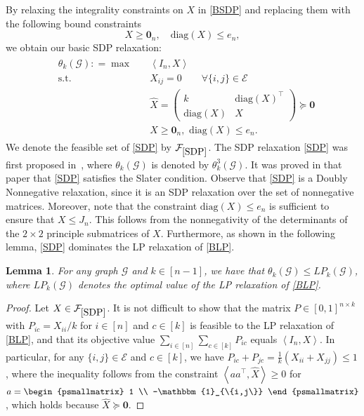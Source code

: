 \documentclass[11pt, a4paper]{article}
\newtheorem{lemma}[theorem]{Lemma}
\newcommand{\diag}[1]{{\text{diag}\left(#1\right)}}
\newcommand{\IP}[2]{\left\langle #1, #2 \right\rangle}
\newcommand{\eqdef}{\mathrel{\mathop:}=}
\newcommand{\psd}{\succeq}
\newcommand{\mc}{\mathcal}
\newcommand{\aug}[1]{\hat{#1}}
\begin{document}
By relaxing the integrality constraints on $X$ in \eqref{BSDP} and replacing them with the following bound constraints
\begin{equation}
    X \geq \textbf{0}_n, \quad \diag{X} \leq e_n, \label{eq bounds}
\end{equation}
we obtain our basic SDP relaxation:
\begin{align} \tag{SDP$_k$} \label{SDP} &\begin{aligned}
    \theta_k(\mc{G}) \eqdef \max \quad & \IP{I_n}{X} \\
    \text{s.t.} \quad & X_{ij} = 0 \qquad \forall \{i,j\} \in \mc{E} \\
    & \aug{X} = \begin{pmatrix} k & \diag{X}^\top \\ \diag{X} & X \end{pmatrix} \psd \textbf{0} \\
    & X \geq \textbf{0}_n, \,\, \diag{X} \leq e_n.
\end{aligned} \end{align}
We denote the feasible set of \eqref{SDP} by $\mc{F}_{\eqref{SDP}}$.
The SDP relaxation \eqref{SDP} was first proposed in~\cite{Kuryatnikova2022MkCSProblem}, where $\theta_k(\mc{G})$ is denoted by $\theta^3_k(\mc{G})$.
It was proved in that paper that \eqref{SDP} satisfies the Slater condition.
Observe that \eqref{SDP} is a Doubly Nonnegative relaxation, since it is an SDP relaxation over the set of nonnegative matrices. 
Moreover, note that the constraint $\diag{X} \leq e_n$ is sufficient to ensure that $X \leq J_n$. This follows from the nonnegativity of the determinants of the $2\times 2$ principle submatrices of $X$.
Furthermore, as shown in the following lemma, \eqref{SDP} dominates the LP relaxation of \eqref{BLP}.
\begin{lemma}
    For any graph $\mc{G}$ and $k \in [n-1]$, we have that $\theta_k(\mc{G}) \leq LP_k(\mc{G})$, where $LP_k(\mc{G})$ denotes the optimal value of the LP relaxation of \eqref{BLP}.
\end{lemma}
\begin{proof}
   Let $X \in \mc{F}_{\eqref{SDP}}$. It is not difficult to show that the matrix $P \in [0,1]^{n \times k}$ with $P_{ic} = X_{ii}/{k}$ for $i \in [n]$ and $c \in [k]$ is feasible to the LP relaxation of \eqref{BLP}, and that its objective value $\sum_{i \in [n]}\sum_{c \in [k]} P_{ic}$ equals $\IP{I_n}{X}$. 
   In particular, for any $\{i,j\} \in \mc{E}$ and $c \in [k]$, we have $P_{ic} + P_{jc} = \frac{1}{k}(X_{ii} + X_{jj}) \leq 1$, where the inequality follows from the constraint $\IP{aa^\top}{\aug{X}} \geq 0$ for $a = \begin{psmallmatrix} 1 \\ -\mathbbm{1}_{\{i,j\}} \end{psmallmatrix}$, which holds because $\aug{X} \psd \textbf{0}$.
\end{proof}
\end{document}
